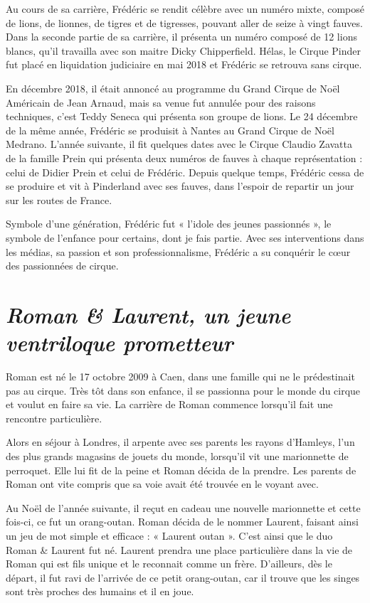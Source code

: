 Au cours de sa carrière, Frédéric se rendit célèbre avec un numéro mixte, composé de lions, de lionnes, de tigres et de tigresses, pouvant aller de seize à vingt fauves. Dans la seconde partie de sa carrière, il présenta un numéro composé de 12 lions blancs, qu'il travailla avec son maitre Dicky Chipperfield. Hélas, le Cirque Pinder fut placé en liquidation judiciaire en mai 2018 et Frédéric se retrouva sans cirque.

En décembre 2018, il était annoncé au programme du Grand Cirque de Noël Américain de Jean Arnaud, mais sa venue fut annulée pour des raisons techniques, c’est Teddy Seneca qui présenta son groupe de lions. Le 24 décembre de la même année, Frédéric se produisit à Nantes au Grand Cirque de Noël Medrano. L’année suivante, il fit quelques dates avec le Cirque Claudio Zavatta de la famille Prein qui présenta deux numéros de fauves à chaque représentation : celui de Didier Prein et celui de Frédéric. Depuis quelque temps, Frédéric cessa de se produire et vit à Pinderland avec ses fauves, dans l’espoir de repartir un jour sur les routes de France.

Symbole d’une génération, Frédéric fut « l’idole des jeunes passionnés », le symbole de l’enfance pour certains, dont je fais partie. Avec ses interventions dans les médias, sa passion et son professionnalisme, Frédéric a su conquérir le cœur des passionnées de cirque. 

\section*{\texorpdfstring{\textit{Roman \& Laurent, un jeune ventriloque prometteur}}{Roman et Laurent, un jeune ventriloque prometteur}}
{}

Roman est né le 17 octobre 2009 à Caen, dans une famille qui ne le prédestinait pas au cirque. Très tôt dans son enfance, il se passionna pour le monde du cirque et voulut en faire sa vie. La carrière de Roman commence lorsqu’il fait une rencontre particulière.

Alors en séjour à Londres, il arpente avec ses parents les rayons d’Hamleys, l’un des plus grands magasins de jouets du monde, lorsqu’il vit une marionnette de perroquet. Elle lui fit de la peine et Roman décida de la prendre. Les parents de Roman ont vite compris que sa voie avait été trouvée en le voyant avec.

Au Noël de l’année suivante, il reçut en cadeau une nouvelle marionnette et cette fois-ci, ce fut un orang-outan. Roman décida de le nommer Laurent, faisant ainsi un jeu de mot simple et efficace : « Laurent outan ». C’est ainsi que le duo Roman \& Laurent fut né. Laurent prendra une place particulière dans la vie de Roman qui est fils unique et le reconnait comme un frère. D’ailleurs, dès le départ, il fut ravi de l’arrivée de ce petit orang-outan, car il trouve que les singes sont très proches des humains et il en joue.

